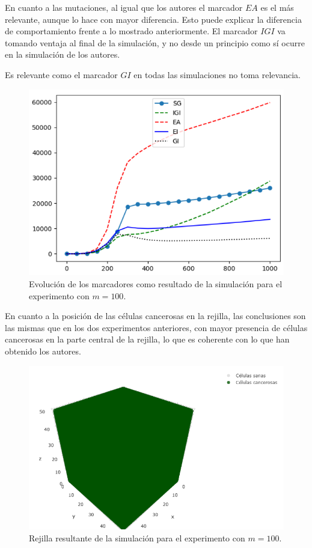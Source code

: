 En cuanto a las mutaciones, al igual que los autores el marcador $EA$ es el más relevante, aunque lo hace
con mayor diferencia. Esto puede explicar la diferencia de comportamiento frente a lo mostrado anteriormente.
El marcador $IGI$ va tomando ventaja al final de la simulación, y no desde un principio como sí ocurre en
la simulación de los autores.

Es relevante como el marcador $GI$ en todas las simulaciones no toma relevancia.

\begin{figure}[h]
\centering
\includegraphics[scale=0.8]{figures/experiments/exp3/mutations}
\caption{Evolución de los marcadores como resultado de la simulación para el experimento con $m = 100$.}
\end{figure}

En cuanto a la posición de las células cancerosas en la rejilla, las conclusiones son las mismas
que en los dos experimentos anteriores, con mayor presencia de células cancerosas en la parte central
de la rejilla, lo que es coherente con lo que han obtenido los autores.

\begin{figure}[h]
\centering
\includegraphics[scale=0.6]{figures/experiments/exp3/grid}
\caption{Rejilla resultante de la simulación para el experimento con $m = 100$.}
\end{figure}

